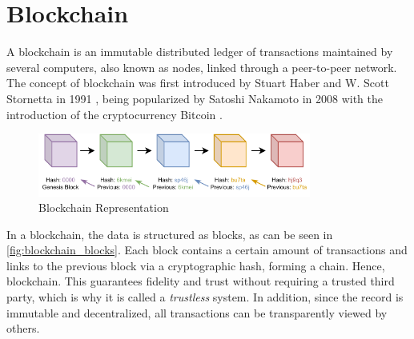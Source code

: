 

\section{Blockchain}\label{fundamentals:blockchain}

A blockchain is an immutable distributed ledger of transactions maintained by several computers, also known as nodes, linked through a peer-to-peer network. The concept of blockchain was first introduced by Stuart Haber and W. Scott Stornetta in 1991 \cite{10.48550/ARXIV.1810.06130}, being popularized by Satoshi Nakamoto in 2008 with the introduction of the cryptocurrency Bitcoin \cite{nakamoto2009bitcoin}.

\begin{figure}[h]
    \centering
    \includegraphics[width=0.8\textwidth]{graphics/blockchain.pdf}
    \caption{Blockchain Representation}
    \label{fig:blockchain_blocks}
\end{figure}

In a blockchain, the data is structured as blocks, as can be seen in \autoref{fig:blockchain_blocks}. Each block contains a certain amount of transactions and links to the previous block via a cryptographic hash, forming a chain. Hence, blockchain. This guarantees fidelity and trust without requiring a trusted third party, which is why it is called a \textit{trustless} system. In addition, since the record is immutable and decentralized, all transactions can be transparently viewed by others.

